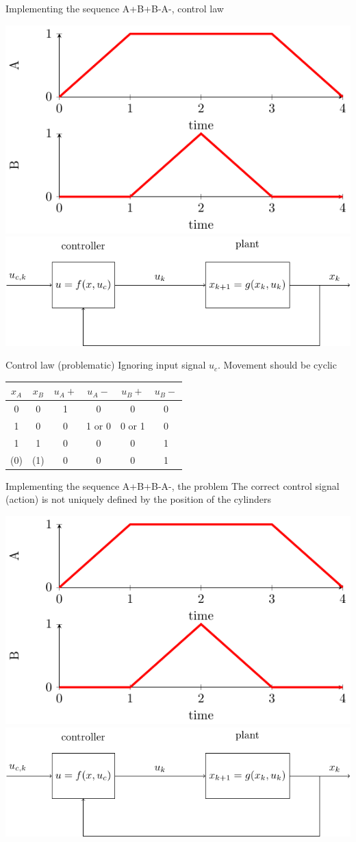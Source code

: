 \documentclass[presentation,aspectratio=1610]{beamer}
\begin{document}
\begin{frame}[label={sec:org85c4849}]{Implementing the sequence A+B+B-A-, control law}
\begin{center}
\includegraphics[width=0.3\linewidth]{../../figures/AplusBplusBminAmin}
\includegraphics[width=0.68\linewidth]{../../figures/logic-control-loop}
\end{center}
\begin{block}{Control law (problematic)}
Ignoring input signal \(u_c\). Movement should be cyclic

\begin{center}
\begin{tabular}{|cc|cccc|}
\hline
\(x_A\) & \(x_B\) & \(u_A+\) & \(u_A-\) & \(u_B+\) & \(u_B-\)\\
\hline
0 & 0 & 1 & 0 & 0 & 0\\
1 & 0 & 0 & 1 or 0 & 0 or 1 & 0\\
1 & 1 & 0 & 0 & 0 & 1\\
(0) & (1) & 0 & 0 & 0 & 1\\
\hline
\end{tabular}
\end{center}
\end{block}
\end{frame}



\begin{frame}[label={sec:orgb489c40}]{Implementing the sequence A+B+B-A-, the problem}
\alert{The correct control signal (action) is not uniquely defined by the position of the cylinders}
\begin{center}
\includegraphics[width=0.5\linewidth]{../../figures/AplusBplusBminAmin}\\
\includegraphics[width=0.8\linewidth]{../../figures/logic-control-loop}
\end{center}
\end{frame}
\end{document}
